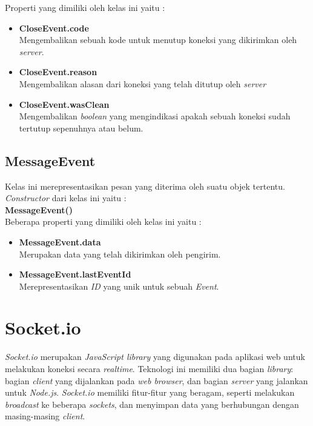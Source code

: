 Properti yang dimiliki oleh kelas ini yaitu : 

\begin{itemize}
	\item \textbf{CloseEvent.code} \\ Mengembalikan sebuah kode untuk menutup koneksi yang dikirimkan oleh \textit{server}.
	\item \textbf{CloseEvent.reason} \\ Mengembalikan alasan dari koneksi yang telah ditutup oleh \textit{server}
	\item \textbf{CloseEvent.wasClean} \\ Mengembalikan \textit{boolean} yang mengindikasi apakah sebuah koneksi sudah tertutup sepenuhnya atau belum.
\end{itemize}

\subsection{MessageEvent}
Kelas ini merepresentasikan pesan yang diterima oleh suatu objek tertentu. \textit{Constructor} dari kelas ini yaitu : \\

\textbf{MessageEvent()} \\

Beberapa properti yang dimiliki oleh kelas ini yaitu : 

\begin{itemize}
	\item \textbf{MessageEvent.data} \\ Merupakan data yang telah dikirimkan oleh pengirim.
	\item \textbf{MessageEvent.lastEventId} \\ Merepresentasikan \textit{ID} yang unik untuk sebuah \textit{Event}.
\end{itemize}



\section{Socket.io}
\label{sec:Socket.io}

\textit{Socket.io} merupakan \textit{JavaScript library} yang digunakan pada aplikasi web untuk melakukan koneksi secara \textit{realtime}. Teknologi ini memiliki dua bagian \textit{library}: bagian \textit{client} yang dijalankan pada \textit{web browser}, dan bagian \textit{server} yang jalankan untuk \textit{Node.js}. \textit{Socket.io} memiliki fitur-fitur yang beragam, seperti melakukan \textit{broadcast} ke beberapa \textit{sockets}, dan menyimpan data yang berhubungan dengan masing-masing \textit{client}.


